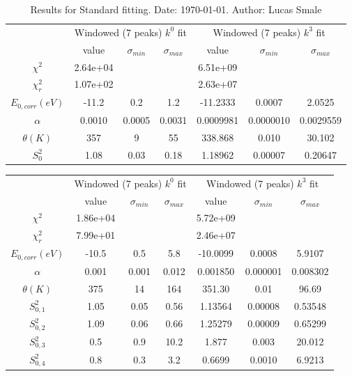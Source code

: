 \documentclass{article}
\begin{document}
\begin{landscape}
\begin{table}[ht]
\centering
\begin{tabular}{c||c|c|c||c|c|c}
\hline
&\multicolumn{3}{|c}{Windowed (7 peaks) $k^{0}$ fit}&\multicolumn{3}{|c}{Windowed (7 peaks) $k^{3}$ fit}\\
& value & $\sigma_{min}$ & $\sigma_{max}$& value & $\sigma_{min}$ & $\sigma_{max}$\\
\hline
$\chi^2$   & 2.64e+04 & & & 6.51e+09 & & \\
$\chi^2_r$ & 1.07e+02 & & & 2.63e+07 & & \\
\hline
$E_{0,corr} (eV)$& -11.2 & 0.2 & 1.2 & -11.2333 & 0.0007 & 2.0525 \\
$\alpha $       & 0.0010 & 0.0005 & 0.0031 & 0.0009981 & 0.0000010 & 0.0029559 \\
$\theta (K) $   & 357 & 9 & 55 & 338.868 & 0.010 & 30.102 \\
$S^2_{0}$& 1.08 & 0.03 & 0.18 & 1.18962 & 0.00007 & 0.20647 \\
\hline
\end{tabular}
 \caption{Results for Standard fitting. Date: \today. Author: Lucas Smale}
\end{table}
\begin{table}[ht]
\centering
\begin{tabular}{c||c|c|c||c|c|c}
\hline
&\multicolumn{3}{|c}{Windowed (7 peaks) $k^{0}$ fit}&\multicolumn{3}{|c}{Windowed (7 peaks) $k^{3}$ fit}\\
& value & $\sigma_{min}$ & $\sigma_{max}$& value & $\sigma_{min}$ & $\sigma_{max}$\\
\hline
$\chi^2$   & 1.86e+04 & & & 5.72e+09 & & \\
$\chi^2_r$ & 7.99e+01 & & & 2.46e+07 & & \\
\hline
$E_{0,corr} (eV)$& -10.5 & 0.5 & 5.8 & -10.0099 & 0.0008 & 5.9107 \\
$\alpha $       & 0.001 & 0.001 & 0.012 & 0.001850 & 0.000001 & 0.008302 \\
$\theta (K) $   & 375 & 14 & 164 & 351.30 & 0.01 & 96.69 \\
$S^2_{0,1}$& 1.05 & 0.05 & 0.56 & 1.13564 & 0.00008 & 0.53548 \\
$S^2_{0,2}$& 1.09 & 0.06 & 0.66 & 1.25279 & 0.00009 & 0.65299 \\
$S^2_{0,3}$& 0.5 & 0.9 & 10.2 & 1.877 & 0.003 & 20.012 \\
$S^2_{0,4}$& 0.8 & 0.3 & 3.2 & 0.6699 & 0.0010 & 6.9213 \\

\end{tabular}
\end{table}
\end{landscape}
\end{document}

